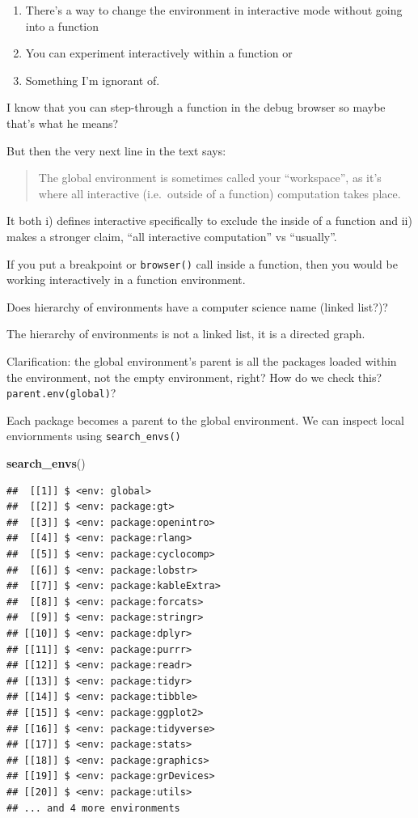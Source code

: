\documentclass[]{book}
\newenvironment{Shaded}{\begin{snugshade}}{\end{snugshade}}
\newcommand{\KeywordTok}[1]{\textcolor[rgb]{0.13,0.29,0.53}{\textbf{#1}}}
\newcommand{\NormalTok}[1]{#1}
\providecommand{\tightlist}{%
  \setlength{\itemsep}{0pt}\setlength{\parskip}{0pt}}
\begin{document}
\begin{enumerate}
\def\labelenumi{\arabic{enumi}.}
\tightlist
\item
  There's a way to change the environment in interactive mode without going into a function
\item
  You can experiment interactively within a function or
\item
  Something I'm ignorant of.
\end{enumerate}

I know that you can step-through a function in the debug browser so maybe that's what he means?

But then the very next line in the text says:

\begin{quote}
The global environment is sometimes called your ``workspace'', as it's where all interactive (i.e.~outside of a function) computation takes place.
\end{quote}

It both i) defines interactive specifically to exclude the inside of a function and ii) makes a stronger claim, ``all interactive computation'' vs ``usually''.

If you put a breakpoint or \texttt{browser()} call inside a function, then you would be working interactively in a function environment.

Does hierarchy of environments have a computer science name (linked list?)?

The hierarchy of environments is not a linked list, it is a directed graph.

Clarification: the global environment's parent is all the packages loaded within the environment, not the empty environment, right? How do we check this? \texttt{parent.env(global)}?

Each package becomes a parent to the global environment. We can inspect local enviornments using \texttt{search\_envs()}

\begin{Shaded}
\begin{Highlighting}[]
\KeywordTok{search_envs}\NormalTok{()}
\end{Highlighting}
\end{Shaded}

\begin{verbatim}
##  [[1]] $ <env: global>
##  [[2]] $ <env: package:gt>
##  [[3]] $ <env: package:openintro>
##  [[4]] $ <env: package:rlang>
##  [[5]] $ <env: package:cyclocomp>
##  [[6]] $ <env: package:lobstr>
##  [[7]] $ <env: package:kableExtra>
##  [[8]] $ <env: package:forcats>
##  [[9]] $ <env: package:stringr>
## [[10]] $ <env: package:dplyr>
## [[11]] $ <env: package:purrr>
## [[12]] $ <env: package:readr>
## [[13]] $ <env: package:tidyr>
## [[14]] $ <env: package:tibble>
## [[15]] $ <env: package:ggplot2>
## [[16]] $ <env: package:tidyverse>
## [[17]] $ <env: package:stats>
## [[18]] $ <env: package:graphics>
## [[19]] $ <env: package:grDevices>
## [[20]] $ <env: package:utils>
## ... and 4 more environments
\end{verbatim}
\end{document}
